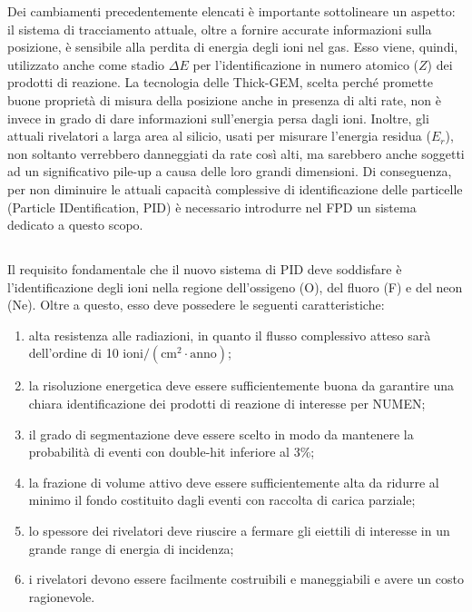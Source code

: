 Dei cambiamenti precedentemente elencati è importante sottolineare un aspetto: il sistema di tracciamento attuale, oltre a fornire accurate informazioni sulla posizione, è sensibile alla perdita di energia degli ioni nel gas. Esso viene, quindi, utilizzato anche come stadio $\Delta E$ per l'identificazione in numero atomico ($Z$) dei prodotti di reazione.
La tecnologia delle Thick-GEM, scelta perché promette buone proprietà di misura della posizione anche in presenza di alti rate, non è invece in grado di dare informazioni sull'energia persa dagli ioni.
Inoltre, gli attuali rivelatori a larga area al silicio, usati per misurare l'energia residua ($ E_r $), non soltanto verrebbero danneggiati da rate così alti, ma sarebbero anche soggetti ad un significativo pile-up a causa delle loro grandi dimensioni.
Di conseguenza, per non diminuire le attuali capacità complessive di identificazione delle particelle (Particle IDentification, PID) è necessario introdurre nel FPD un sistema dedicato a questo scopo.



\subsection{} \label{sez:sistema_identif_part}


Il requisito fondamentale che il nuovo sistema di PID deve soddisfare è l'identificazione degli ioni nella regione dell'ossigeno (O), del fluoro (F) e del neon (Ne). 
Oltre a questo, esso deve possedere le seguenti caratteristiche:
\begin{enumerate}
	\item alta resistenza alle radiazioni, in quanto il flusso complessivo atteso sarà dell'ordine di 10 $\mbox{ioni}/(\mbox{cm}^2 \cdot \mbox{anno})$;
	\item la risoluzione energetica deve essere sufficientemente buona da garantire una chiara identificazione dei prodotti di reazione di interesse per NUMEN;
	\item il grado di segmentazione deve essere scelto in modo da mantenere la probabilità di eventi con double-hit inferiore al 3\%;
	\item la frazione di volume attivo deve essere sufficientemente alta da ridurre al minimo il fondo costituito dagli eventi con raccolta di carica parziale;
	\item lo spessore dei rivelatori deve riuscire a fermare gli eiettili di interesse in un grande range di energia di incidenza;
	\item i rivelatori devono essere facilmente costruibili e maneggiabili e avere un costo ragionevole.
\end{enumerate}


